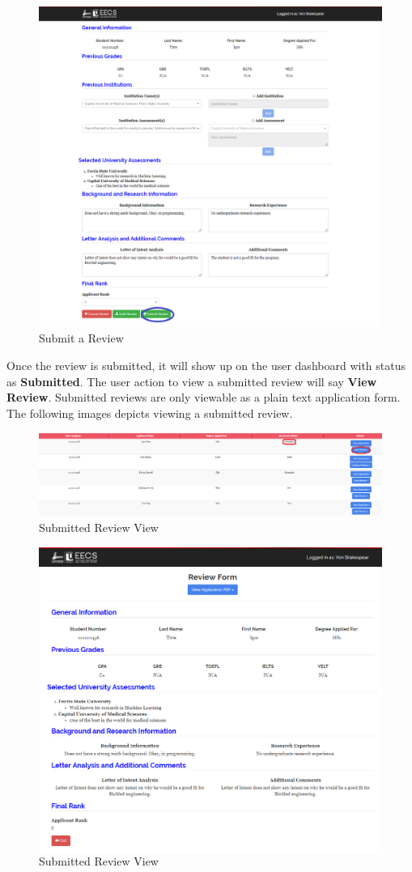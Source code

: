 \documentclass[fontsize=12pt,paper=letter,twoside]{scrartcl}
\begin{document}
\begin{figure}[!htb]
\begin{center}
\includegraphics[width=.9\textwidth]{images/submit_review.png}
\end{center}
\caption{Submit a Review}
\label{fig:submit_review}
\end{figure}

\bigskip
\noindent Once the review is submitted, it will show up on the user dashboard with status as \textbf{Submitted}. The user action to view a submitted review will say \textbf{View Review}. Submitted reviews are only viewable as a plain text application form. The following images depicts viewing a submitted review.

\begin{figure}[!htb]
\begin{center}
\includegraphics[width=.9\textwidth]{images/submitted_review.png}
\end{center}
\caption{Submitted Review View}
\label{fig:submitted_review}
\end{figure}

\begin{figure}[!htb]
\begin{center}
\includegraphics[width=.7\textwidth]{images/submit_review_view.png}
\end{center}
\caption{Submitted Review View}
\label{fig:submit_review_view}
\end{figure}
\end{document}
